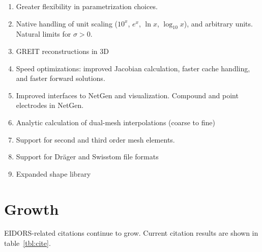 \documentclass[10pt,a4paper]{article}
\begin{document}
\begin{multicols}{2}
\begin{enumerate}
\item Greater flexibility in parametrization choices.

\item Native handling of unit scaling ($10^x$, $e^x$, $\ln x$, $\log_{10} x$),
 and arbitrary units.
  Natural limits for $\sigma > 0$. %

\item GREIT reconstructions in 3D

\item Speed optimizations: improved Jacobian calculation, faster cache handling, and 
  faster forward solutions.


\item Improved interfaces to NetGen and visualization.
      Compound and point electrodes in NetGen.

\item Analytic calculation of dual-mesh interpolations (coarse to fine)

\item Support for second and third order mesh elements.

\item Support for Dr\"ager and Swisstom file formats

\item Expanded shape library
\end{enumerate}

\section{Growth}
EIDORS-related citations continue to grow. Current citation results are
shown in table~\ref{tbl:cite}.


\end{multicols}
\end{document}
